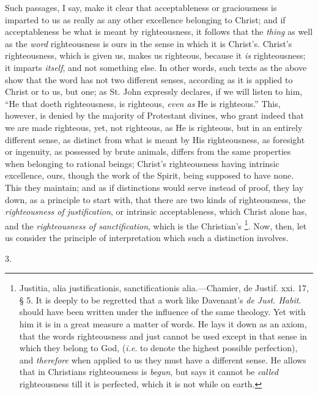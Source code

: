 Such passages, I say, make it clear that acceptableness or
graciousness is imparted to us as really as any other excellence
belonging to Christ; and if acceptableness be what is meant by
righteousness, it follows that the \emph{thing} as well as the \emph{word}
righteousness is ours in the sense in which it is Christ's. Christ's
righteousness, which is given us, makes us righteous, because it \emph{is}
righteousness; it imparts \emph{itself}, and not something else. In
other words, such texts as the above show that the word has not two
different senses, according as it is applied to Christ or to us, but
one; as St. John expressly declares, if we will listen to him,
``He that doeth righteousness, is righteous, \emph{even as} He is
righteous.'' This, however, is denied by the majority of
Protestant divines, who grant indeed that we are made righteous, yet,
not righteous, as He is righteous, but in an entirely different sense,
as distinct from what is meant by His righteousness, as foresight or
ingenuity, as possessed by brute animals, differs from the same
properties when belonging to rational beings; Christ's righteousness
having intrinsic excellence, ours, though the work of the Spirit,
being supposed to have none. This they maintain; and as if distinctions would serve instead of proof, they lay down, as a
principle to start with, that there are two kinds of righteousness,
the \emph{righteousness of justification}, or intrinsic
acceptableness, which Christ alone has, and the \emph{righteousness of
sanctification}, which is the Christian's \footnote{Justitia, alia justificationis, sanctificationis alia.—Chamier,
de Justif. xxi. 17, § 5. It is deeply to be regretted that a work
like Davenant's \emph{de Just. Habit}. should have been written under
the influence of the same theology. Yet with him it is in a great
measure a matter of words. He lays it down as an axiom, that the words
righteousness and just cannot be used except in that sense in which
they belong to God, (\emph{i.e}. to denote the highest possible
perfection), and \emph{therefore} when applied to us they must have a
different sense. He allows that in Christians righteousness is \emph{begun},
but says it cannot be \emph{called} righteousness till it is
perfected, which it is not while on earth.}. Now, then, let us consider the principle of interpretation
which such a distinction involves.

3.

